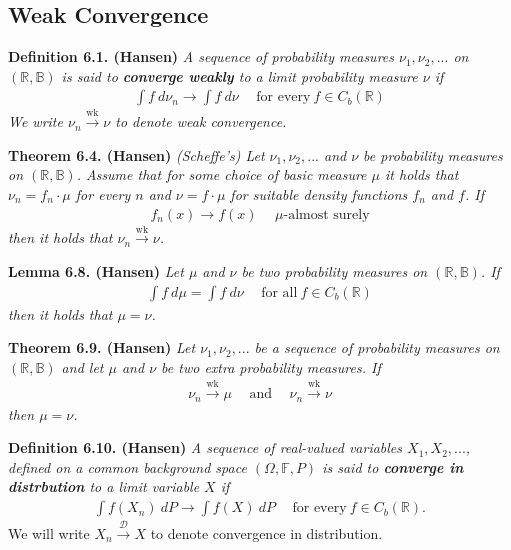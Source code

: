 \documentclass[a4paper,12pt,openany]{book}
\begin{document}
\hypertarget{weak-convergence}{%
\subsection{Weak Convergence}\label{weak-convergence}}

\textbf{Definition 6.1. (Hansen)} \emph{A sequence of probability measures \(\nu_1,\nu_2,...\) on \((\mathbb{R},\mathbb{B})\) is said to \textbf{converge weakly} to a limit probability measure \(\nu\) if}
\begin{align*}
    \int f\ d\nu_n\to \int f\ d\nu\hspace{15pt}\text{for every}\ f\in C_b(\mathbb{R})\tag{6.2}
\end{align*}
\emph{We write \(\nu_n\stackrel{\text{wk}}{\to} \nu\) to denote weak convergence.}

\textbf{Theorem 6.4. (Hansen)} \emph{(Scheffe's) Let \(\nu_1,\nu_2,...\) and \(\nu\) be probability measures on \((\mathbb{R},\mathbb{B})\). Assume that for some choice of basic measure \(\mu\) it holds that \(\nu_n=f_n\cdot \mu\) for every \(n\) and \(\nu = f\cdot \mu\) for suitable density functions \(f_n\) and \(f\). If}
\begin{align*}
    f_n(x)\to f(x)\hspace{15pt}\mu\text{-almost surely}
\end{align*}
\emph{then it holds that \(\nu_n\stackrel{\text{wk}}{\to} \nu\).}

\textbf{Lemma 6.8. (Hansen)} \emph{Let \(\mu\) and \(\nu\) be two probability measures on \((\mathbb{R},\mathbb{B})\). If}
\begin{align*}
    \int f\ d\mu=\int f\ d\nu\hspace{15pt}\text{for all}\ f\in C_b(\mathbb{R})\tag{6.7}
\end{align*}
\emph{then it holds that \(\mu=\nu\).}

\textbf{Theorem 6.9. (Hansen)} \emph{Let \(\nu_1,\nu_2,...\) be a sequence of probability measures on \((\mathbb{R},\mathbb{B})\) and let \(\mu\) and \(\nu\) be two extra probability measures. If}
\begin{align*}
    \nu_n\stackrel{\text{wk}}{\to} \mu\hspace{15pt}\text{and}\hspace{15pt}\nu_n\stackrel{\text{wk}}{\to} \nu
\end{align*}
\emph{then \(\mu=\nu\).}

\textbf{Definition 6.10. (Hansen)} \emph{A sequence of real-valued variables \(X_1,X_2,...\), defined on a common background space \((\Omega,\mathbb{F},P)\) is said to \textbf{converge in distrbution} to a limit variable \(X\) if}
\begin{align*}
    \int f(X_n)\ dP\to \int f(X)\ dP\hspace{15pt}\text{for every}\ f\in C_b(\mathbb{R}).\tag{6.9}
\end{align*}
We will write \(X_n\stackrel{\mathcal{D}}{\to} X\) to denote convergence in distribution.
\end{document}
